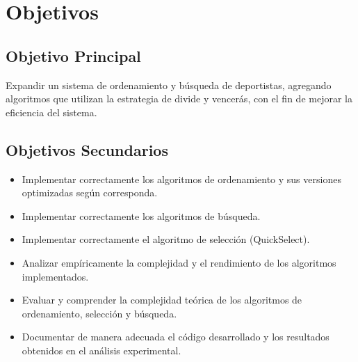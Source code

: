 \chapter{Objetivos}
\section{Objetivo Principal}
Expandir un sistema de ordenamiento y búsqueda de deportistas, agregando algoritmos que utilizan la estrategia de divide y vencerás, con el fin de mejorar la eficiencia del sistema.
\section{Objetivos Secundarios}

\begin{itemize}
    \item Implementar correctamente los algoritmos de ordenamiento y sus versiones optimizadas según corresponda.
    \item Implementar correctamente los algoritmos de búsqueda.
    \item Implementar correctamente el algoritmo de selección (QuickSelect).
    \item Analizar empíricamente la complejidad y el rendimiento de los algoritmos implementados.
    \item Evaluar y comprender la complejidad teórica de los algoritmos de ordenamiento, selección y búsqueda.
    \item Documentar de manera adecuada el código desarrollado y los resultados obtenidos en el análisis experimental.
\end{itemize}